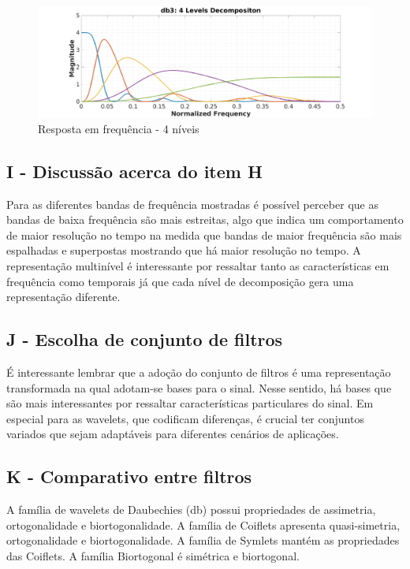 \documentclass{article}
\begin{document}
\begin{figure}[H]
	\begin{center}
		\includegraphics[scale=0.25]{../Q1_db3-4levels.png}
		\caption{Resposta em frequência - 4 níveis}
		\label{fig:Q1_db3_4}
	\end{center}
\end{figure}

\subsection*{I - Discussão acerca do item H}
Para as diferentes bandas de frequência mostradas é possível perceber que as bandas de baixa frequência são mais estreitas, algo que indica um comportamento de maior resolução no tempo na medida que bandas de maior frequência são mais espalhadas e superpostas mostrando que há maior resolução no tempo. A representação multinível é interessante por ressaltar tanto as características em frequência como temporais já que cada nível de decomposição gera uma representação diferente.

\subsection*{J - Escolha de conjunto de filtros}
É interessante lembrar que a adoção do conjunto de filtros é uma representação transformada na qual adotam-se bases para o sinal. Nesse sentido, há bases que são mais interessantes por ressaltar características particulares do sinal. Em especial para as wavelets, que codificam diferenças, é crucial ter conjuntos variados que sejam adaptáveis para diferentes cenários de aplicações.

\subsection*{K - Comparativo entre filtros}
A família de wavelets de Daubechies (db) possui propriedades de assimetria, ortogonalidade e biortogonalidade. A família de Coiflets apresenta quasi-simetria, ortogonalidade e biortogonalidade. A família de Symlets mantém as propriedades das Coiflets. A família Biortogonal é simétrica e biortogonal.
\end{document}
